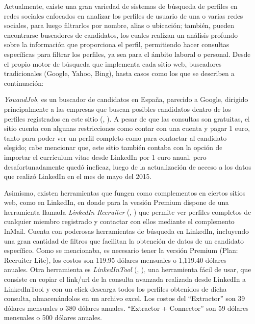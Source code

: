 Actualmente, existe una gran variedad de sistemas de búsqueda de perfiles en redes sociales enfocados en analizar los perfiles de usuario de una o varias redes sociales, para luego filtrarlos por nombre, alias o ubicación; también, pueden encontrarse buscadores de candidatos, los cuales realizan un análisis profundo sobre la información que proporciona el perfil, permitiendo hacer consultas específicas para filtrar los perfiles, ya sea para el ámbito laboral o personal. Desde el propio motor de búsqueda que implementa cada sitio web, buscadores tradicionales (Google, Yahoo, Bing), hasta casos como los que se describen a continuación:

\textit{YouandJob}, es un buscador de candidatos en España, parecido a Google, dirigido principalmente a las empresas que buscan posibles candidatos dentro de los perfiles registrados en este sitio (\citeauthor{youandjob}, \citeyear{youandjob}). A pesar de que las consultas son gratuitas, el sitio cuenta con algunas restricciones como contar con una cuenta y pagar 1 euro, tanto para poder ver un perfil completo como para contactar al candidato elegido; cabe mencionar que, este sitio también contaba con la opción de importar el currículum vitae desde LinkedIn por 1 euro anual, pero desafortunadamente quedó ineficaz, luego de la actualización de acceso a los datos que realizó LinkedIn en el mes de mayo del 2015. 

Asimismo, existen herramientas que fungen como complementos en ciertos sitios web, como en LinkedIn, en donde para la versión Premium dispone de una herramienta llamada \textit{LinkedIn Recruiter} (\citeauthor{linkrec}, \citeyear{linkrec}) que permite ver perfiles completos de cualquier miembro registrado y contactar con ellos mediante el complemento InMail. Cuenta con poderosas herramientas de búsqueda en LinkedIn, incluyendo una gran cantidad de filtros que facilitan la obtención de datos de un candidato específico. Como se mencionaba, es necesario tener la versión Premium (Plan: Recruiter Lite), los costos son 119.95 d\'olares mensuales o 1,119.40 dólares anuales. Otra herramienta es \textit{LinkedInTool} (\citeauthor{linktool}, \citeyear{linktool}), una herramienta fácil de usar, que consiste en copiar el link/url de la consulta avanzada realizada desde LinkedIn a LinkedInTool y con un click descarga todos los perfiles obtenidos de dicha consulta, almacenándolos en un archivo excel. Los costos del “Extractor” son 39 dólares mensuales o 380 dólares anuales. “Extractor + Connector” son 59 dólares mensuales o 500 dólares anuales. 

